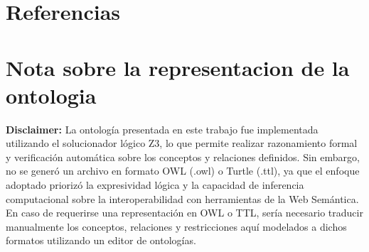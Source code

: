 \documentclass[letterpaper, 12pt]{article}
\begin{document}
\newpage
\section*{Referencias}
\renewcommand{\refname}{}
\renewcommand{\bibname}{}
\vspace{-1.5cm}
\printbibliography{}

\newpage
\section*{Nota sobre la representacion de la ontologia}

\textbf{Disclaimer:}
La ontología presentada en este trabajo fue implementada utilizando el solucionador lógico Z3, lo que permite realizar razonamiento formal y verificación automática sobre los conceptos y relaciones definidos. Sin embargo, no se generó un archivo en formato OWL (.owl) o Turtle (.ttl), ya que el enfoque adoptado priorizó la expresividad lógica y la capacidad de inferencia computacional sobre la interoperabilidad con herramientas de la Web Semántica.
En caso de requerirse una representación en OWL o TTL, sería necesario traducir manualmente los conceptos, relaciones y restricciones aquí modelados a dichos formatos utilizando un editor de ontologías.

\newpage

\end{document}
